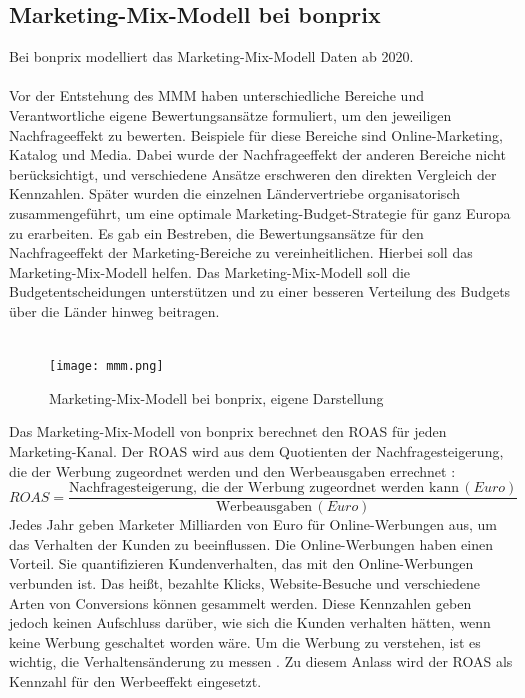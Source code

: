 \subsection{Marketing-Mix-Modell bei bonprix} 
\label{Marketing-Mix-ModellBeiBonprix}
Bei bonprix modelliert das Marketing-Mix-Modell Daten ab 2020. \\\\
Vor der Entstehung des \ac{MMM} haben unterschiedliche Bereiche und Verantwortliche eigene Bewertungsansätze formuliert, um den jeweiligen Nachfrageeffekt zu bewerten. Beispiele für diese Bereiche sind Online-Marketing, Katalog und Media. Dabei wurde der Nachfrageeffekt der anderen Bereiche nicht berücksichtigt, und verschiedene Ansätze erschweren den direkten Vergleich der Kennzahlen. Später wurden die einzelnen Ländervertriebe organisatorisch zusammengeführt, um eine optimale Marketing-Budget-Strategie für ganz Europa zu erarbeiten. Es gab ein Bestreben, die Bewertungsansätze für den Nachfrageeffekt der Marketing-Bereiche zu vereinheitlichen. Hierbei soll das Marketing-Mix-Modell helfen. Das Marketing-Mix-Modell soll die Budgetentscheidungen unterstützen und zu einer besseren Verteilung des Budgets über die Länder hinweg beitragen.\\\\
\begin{figure}[H]
    \centering
    \texttt{[image: mmm.png]}
    \caption{Marketing-Mix-Modell bei bonprix, eigene Darstellung}
    \label{fig:mmmbonprix}
\end{figure}
\noindent
Das Marketing-Mix-Modell von bonprix berechnet den \ac{ROAS} für jeden Marketing-Kanal. Der \ac{ROAS} wird aus dem Quotienten der Nachfragesteigerung, die der Werbung zugeordnet werden und den Werbeausgaben errechnet \cite[2]{roas}:
\begin{equation}
ROAS = \frac{\text{Nachfragesteigerung, die der Werbung zugeordnet werden kann} \, (Euro)}{\text{Werbeausgaben} \, (Euro)}
\end{equation}
Jedes Jahr geben Marketer Milliarden von Euro für Online-Werbungen aus, um das Verhalten der Kunden zu beeinflussen. Die Online-Werbungen haben einen Vorteil. Sie quantifizieren Kundenverhalten, das mit den Online-Werbungen verbunden ist. Das heißt, bezahlte Klicks, Website-Besuche und verschiedene Arten von Conversions können gesammelt werden. Diese Kennzahlen geben jedoch keinen Aufschluss darüber, wie sich die Kunden verhalten hätten, wenn keine Werbung geschaltet worden wäre. Um die Werbung zu verstehen, ist es wichtig, die Verhaltensänderung zu messen \cite[1]{roas}. Zu diesem Anlass wird der \ac{ROAS} als Kennzahl für den Werbeeffekt eingesetzt. \\\\
